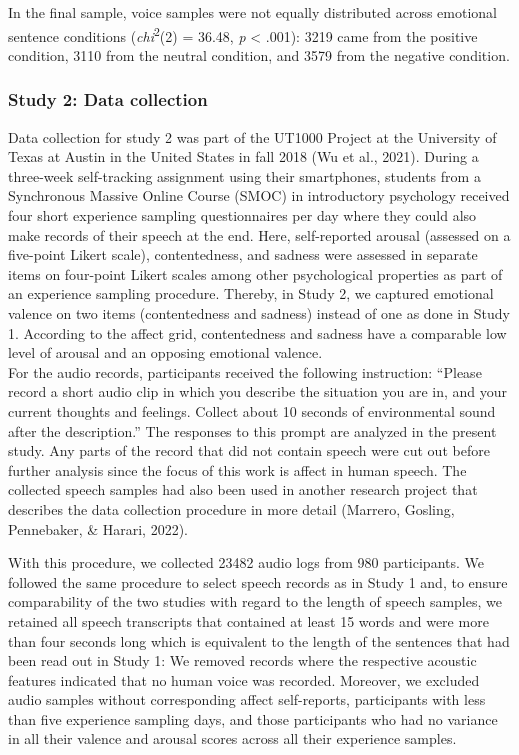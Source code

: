 \documentclass[
  man,floatsintext]{apa6}
\begin{document}
In the final sample, voice samples were not equally distributed across emotional sentence conditions (\emph{chi}\textsuperscript{2}(2) = 36.48, \emph{p} \textless{} .001): 3219 came from the positive condition, 3110 from the neutral condition, and 3579 from the negative condition.

\hypertarget{study-2-data-collection}{%
\subsubsection{Study 2: Data collection}\label{study-2-data-collection}}

Data collection for study 2 was part of the UT1000 Project at the University of Texas at Austin in the United States in fall 2018 (Wu et al., 2021). During a three-week self-tracking assignment using their smartphones, students from a Synchronous Massive Online Course (SMOC) in introductory psychology received four short experience sampling questionnaires per day where they could also make records of their speech at the end. Here, self-reported arousal (assessed on a five-point Likert scale), contentedness, and sadness were assessed in separate items on four-point Likert scales among other psychological properties as part of an experience sampling procedure. Thereby, in Study 2, we captured emotional valence on two items (contentedness and sadness) instead of one as done in Study 1. According to the affect grid, contentedness and sadness have a comparable low level of arousal and an opposing emotional valence.\\
For the audio records, participants received the following instruction: ``Please record a short audio clip in which you describe the situation you are in, and your current thoughts and feelings. Collect about 10 seconds of environmental sound after the description.'' The responses to this prompt are analyzed in the present study. Any parts of the record that did not contain speech were cut out before further analysis since the focus of this work is affect in human speech. The collected speech samples had also been used in another research project that describes the data collection procedure in more detail (Marrero, Gosling, Pennebaker, \& Harari, 2022).

With this procedure, we collected 23482 audio logs from 980 participants. We followed the same procedure to select speech records as in Study 1 and, to ensure comparability of the two studies with regard to the length of speech samples, we retained all speech transcripts that contained at least 15 words and were more than four seconds long which is equivalent to the length of the sentences that had been read out in Study 1: We removed records where the respective acoustic features indicated that no human voice was recorded. Moreover, we excluded audio samples without corresponding affect self-reports, participants with less than five experience sampling days, and those participants who had no variance in all their valence and arousal scores across all their experience samples.
\end{document}
